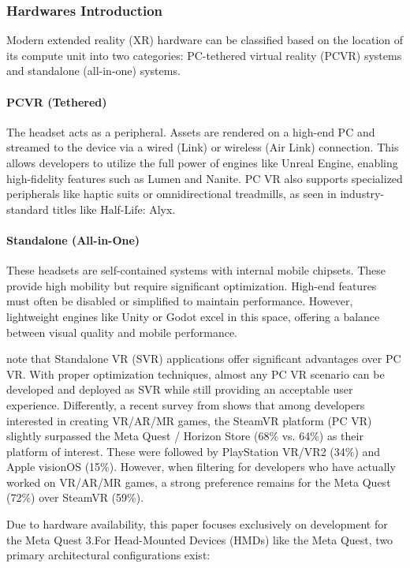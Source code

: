 \subsubsection{Hardwares Introduction}

Modern extended reality (XR) hardware can be classified based on the location of its compute unit into two categories: PC-tethered virtual reality (PCVR) systems and standalone (all-in-one) systems.

\paragraph{PCVR (Tethered)} The headset acts as a peripheral. Assets are rendered on a high-end PC and streamed to the device via a wired (Link) or wireless (Air Link) connection. This allows developers to utilize the full power of engines like Unreal Engine, enabling high-fidelity features such as Lumen and Nanite. PC VR also supports specialized peripherals like haptic suits or omnidirectional treadmills, as seen in industry-standard titles like Half-Life: Alyx.

\paragraph{Standalone (All-in-One)} These headsets are self-contained systems with internal mobile chipsets. These provide high mobility but require significant optimization. High-end features must often be disabled or simplified to maintain performance. However, lightweight engines like Unity or Godot excel in this space, offering a balance between visual quality and mobile performance.

\parencite{rendevski2022vr} note that Standalone VR (SVR) applications offer significant advantages over PC VR. With proper optimization techniques, almost any PC VR scenario can be developed and deployed as SVR while still providing an acceptable user experience. Differently, a recent survey from \parencite{gdc2026report} shows that among developers interested in creating VR/AR/MR games, the SteamVR platform (PC VR) slightly surpassed the Meta Quest / Horizon Store (68\% vs. 64\%) as their platform of interest. These were followed by PlayStation VR/VR2 (34\%) and Apple visionOS (15\%). However, when filtering for developers who have actually worked on VR/AR/MR games, a strong preference remains for the Meta Quest (72\%) over SteamVR (59\%).

Due to hardware availability, this paper focuses exclusively on development for the Meta Quest 3.For Head-Mounted Devices (HMDs) like the Meta Quest, two primary architectural configurations exist:
